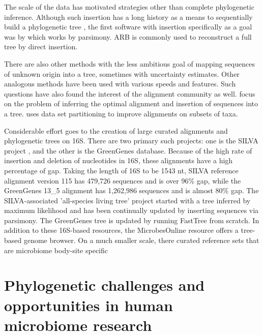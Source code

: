 \documentclass{amsart}
\begin{document}
The scale of the data has motivated strategies other than complete phylogenetic inference.
Although such insertion has a long history as a means to sequentially build a phylogenetic tree \citep{kluge1969quantitative}, the first software with insertion specifically as a goal was by \citep{ludwig2004arb} which works by parsimony.
ARB is commonly used to reconstruct a full tree by direct insertion.

There are also other methods with the less ambitious goal of mapping sequences of unknown origin into a tree, sometimes with uncertainty estimates.
Other analogous methods have been used \citep{wu2008simple,monierEaLargeViruses08,vonMeringEaQuantitative08,stark2010mltreemap,matsen2010pplacer,berger2011performance} with various speeds and features.
Such questions have also found the interest of the alignment community as well.
\citet{berger2011aligning} focus on the problem of inferring the optimal alignment and insertion of sequences into a tree.
\citet{mirarabsepp} uses data set partitioning to improve alignments on subsets of taxa.

Considerable effort goes to the creation of large curated alignments and phylogenetic trees on 16S.
There are two primary such projects: one is the SILVA project \citep{pruesse2007silva,quast2013silva}, and the other is the GreenGenes \citep{desantis2006greengenes,mcdonald2011improved} database.
Because of the high rate of insertion and deletion of nucleotides in 16S, these alignments have a high percentage of gap.
Taking the length of 16S to be 1543 nt,
SILVA reference alignment version 115 has 479,726 sequences and is over 96\% gap,
while the GreenGenes 13\_5 alignment has 1,262,986 sequences and is almost 80\% gap.
The SILVA-associated 'all-species living tree' project \citep{yarza2008all} started with a tree inferred by maximum likelihood and has been continually updated  by inserting sequences via parsimony.
The GreenGenes tree is updated by running FastTree from scratch.
In addition to these 16S-based resources, the MicrobesOnline resource \citep{dehal2010microbesonline} offers a tree-based genome browser.
On a much smaller scale, there curated reference sets that are microbiome body-site specific \citep{chen2010human,griffen2011core,srinivasan2012bacterial}



\section{Phylogenetic challenges and opportunities in human microbiome research}
\end{document}
